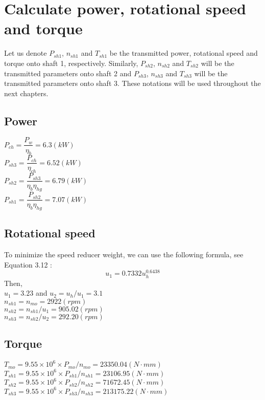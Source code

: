\section{Calculate power, rotational speed and torque}
Let us denote $ P_{sh1} $, $ n_{sh1} $ and $ T_{sh1} $ be the transmitted power, rotational speed and torque onto shaft 1, respectively. Similarly, $ P_{sh2} $, $ n_{sh2} $ and $ T_{sh2} $ will be the transmitted parameters onto shaft 2 and $ P_{sh3} $, $ n_{sh3} $ and $ T_{sh3} $ will be the transmitted parameters onto shaft 3. These notations will be used throughout the next chapters.
\subsection{Power}
$ P_{ch} = \dfrac{P_w}{\eta_b} = 6.3 \unit{(kW)}$\\
$ P_{sh3} = \dfrac{P_{ch}}{\eta_{ch}} = 6.52 \unit{(kW)}$\\
$ P_{sh2} = \dfrac{P_{sh3}}{\eta_b\eta_{hg}} = 6.79 \unit{(kW)}$\\
$ P_{sh1} = \dfrac{P_{sh2}}{\eta_b\eta_{hg}} = 7.07 \unit{(kW)}$
\subsection{Rotational speed}
To minimize the speed reducer weight, we can use the following formula, see Equation 3.12 \cite{tk1}:
\[u_1=0.7332u_h^{0.6438}\]
Then,\\
$ u_1=3.23$ and $ u_2=u_h/u_1=3.1 $\\
$ n_{sh1} = n_{mo} = 2922\unit{(rpm)}$\\
$ n_{sh2} = {n_{sh1}}/{u_{1}} = 905.02 \unit{(rpm)}$\\
$ n_{sh3} = {n_{sh2}}/{u_{2}} = 292.20 \unit{(rpm)}$

\subsection{Torque}
$ T_{mo} = 9.55\times10^6 \times P_{mo}/n_{mo} = 23350.04 \unit{(N\cdot mm)}$\\
$ T_{sh1} = 9.55\times10^6 \times{P_{sh1}}/{n_{sh1}} = 23106.95 \unit{(N\cdot mm)}$\\
$ T_{sh2} = 9.55\times10^6 \times{P_{sh2}}/{n_{sh2}} = 71672.45 \unit{(N\cdot mm)}$\\
$ T_{sh3} = 9.55\times10^6 \times{P_{sh3}}/{n_{sh3}} = 213175.22 \unit{(N\cdot mm)}$\\

